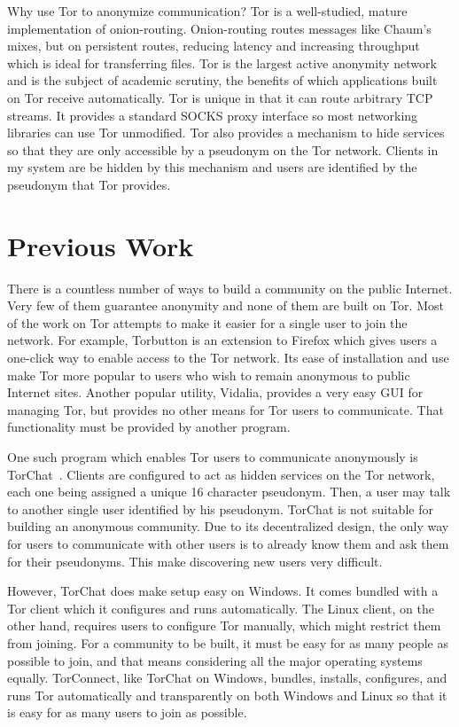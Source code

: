 \documentclass{article}
\begin{document}
Why use Tor to anonymize communication?  Tor is a well-studied, mature implementation of onion-routing.  Onion-routing routes messages like Chaum's mixes, but on persistent routes, reducing latency and increasing throughput which is ideal for transferring files.  Tor is the largest active anonymity network and is the subject of academic scrutiny, the benefits of which applications built on Tor receive automatically.  Tor is unique in that it can route arbitrary TCP streams.  It provides a standard SOCKS proxy interface so most networking libraries can use Tor unmodified.  Tor also provides a mechanism to hide services so that they are only accessible by a pseudonym on the Tor network.  Clients in my system are be hidden by this mechanism and users are identified by the pseudonym that Tor provides.


\section{Previous Work}
There is a countless number of ways to build a community on the public Internet.  Very few of them guarantee anonymity and none of them are built on Tor.  Most of the work on Tor attempts to make it easier for a single user to join the network.  For example, Torbutton is an extension to Firefox which gives users a one-click way to enable access to the Tor network.  Its ease of installation and use make Tor more popular to users who wish to remain anonymous to public Internet sites.  Another popular utility, Vidalia, provides a very easy GUI for managing Tor, but provides no other means for Tor users to communicate.  That functionality must be provided by another program.

One such program which enables Tor users to communicate anonymously is TorChat~\cite{tor-chat}.  Clients are configured to act as hidden services on the Tor network, each one being assigned a unique 16 character pseudonym.  Then, a user may talk to another single user identified by his pseudonym.  TorChat is not suitable for building an anonymous community.  Due to its decentralized design, the only way for users to communicate with other users is to already know them and ask them for their pseudonyms.  This make discovering new users very difficult.

However, TorChat does make setup easy on Windows.  It comes bundled with a Tor client which it configures and runs automatically.  The Linux client, on the other hand, requires users to configure Tor manually, which might restrict them from joining.  For a community to be built, it must be easy for as many people as possible to join, and that means considering all the major operating systems equally.  TorConnect, like TorChat on Windows, bundles, installs, configures, and runs Tor automatically and transparently on both Windows and Linux so that it is easy for as many users to join as possible.
\end{document}
